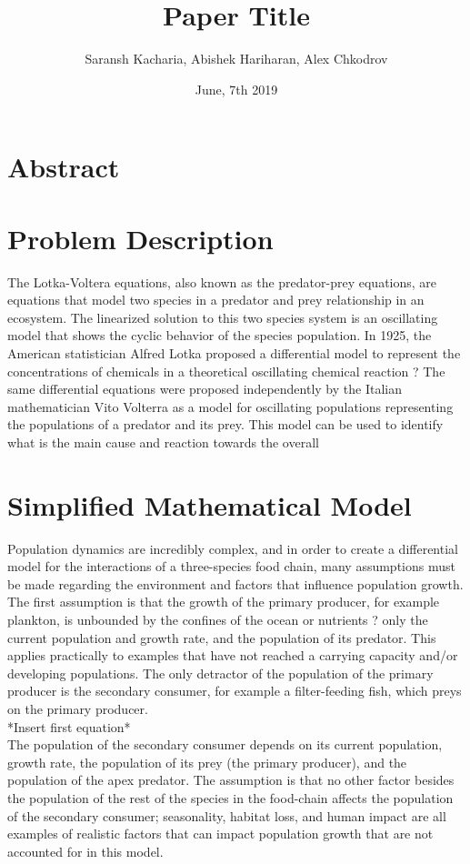 \documentclass[11pt,oneside]{article}
\title{Paper Title}
\author{Saransh Kacharia, Abishek Hariharan, Alex Chkodrov}
\date{June, 7th 2019}
\begin{document}
\maketitle
\pagestyle{fancy}
\section*{Abstract}
\section*{Problem Description}
The Lotka-Voltera equations, also known as the predator-prey equations, are equations that model two species in a predator and prey relationship in an ecosystem. The linearized solution to this two species system is an oscillating model that shows the cyclic behavior of the species population. In 1925, the American statistician Alfred Lotka proposed a differential model to represent the concentrations of chemicals in a theoretical oscillating chemical reaction ? The same differential equations were proposed independently by the Italian mathematician Vito Volterra as a model for oscillating populations representing the populations of a predator and its prey. This model can be used to identify what is the main cause and reaction towards the overall
\section*{Simplified Mathematical Model}

Population dynamics are incredibly complex, and in order to create a differential model for the interactions of a three-species food chain, many assumptions must be made regarding the environment and factors that influence population growth. The first assumption is that the growth of the primary producer, for example plankton, is unbounded by the confines of the ocean or nutrients ? only the current population and growth rate, and the population of its predator. This applies practically to examples that have not reached a carrying capacity and/or developing populations. The only detractor of the population of the primary producer is the secondary consumer, for example a filter-feeding fish, which preys on the primary producer.\\

*Insert first equation*\\

The population of the secondary consumer depends on its current population, growth rate, the population of its prey (the primary producer), and the population of the apex predator. The assumption is that no other factor besides the population of the rest of the species in the food-chain affects the population of the secondary consumer; seasonality, habitat loss, and human impact are all examples of realistic factors that can impact population growth that are not accounted for in this model. \\
\end{document}

